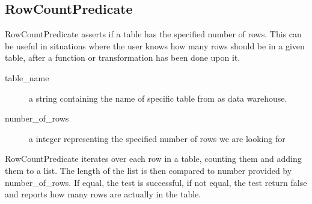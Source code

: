 \subsection{RowCountPredicate}
RowCountPredicate asserts if a table has the specified number of rows. This can be useful in situations where the user knows how many rows should be in a given table, after a function or transformation has been done upon it. 


\begin{description}
\item [table\_name] a string containing the name of specific table from as data warehouse. 
\item [number\_of\_rows] a integer representing the specified number of rows we are looking for
\end{description}

RowCountPredicate iterates over each row in a table, counting them and adding them to a list. The length of the list is then compared to number provided by number\_of\_rows. If equal, the test is successful, if not equal, the test return false and reports how many rows are actually in the table.

